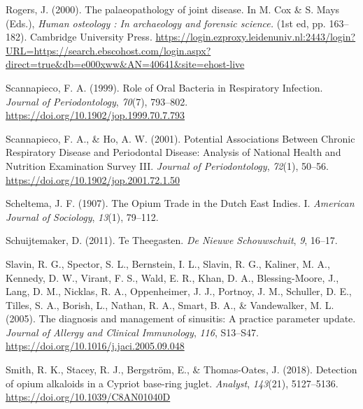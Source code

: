 \documentclass[
]{article}
\newlength{\cslhangindent}
\newlength{\cslentryspacingunit} %
\newenvironment{CSLReferences}[2] %
 {%
  \setlength{\parindent}{0pt}
  \ifodd #1
  \let\oldpar\par
  \def\par{\hangindent=\cslhangindent\oldpar}
  \fi
  \setlength{\parskip}{#2\cslentryspacingunit}
 }%
 {}
\begin{document}
\begin{CSLReferences}{1}{0}
\leavevmode{}%
Rogers, J. (2000). The palaeopathology of joint disease. In M. Cox \& S.
Mays (Eds.), \emph{Human osteology : {In} archaeology and forensic
science.} (1st ed, pp. 163--182). {Cambridge University Press}.
\url{https://login.ezproxy.leidenuniv.nl:2443/login?URL=https://search.ebscohost.com/login.aspx?direct=true\&db=e000xww\&AN=40641\&site=ehost-live}

\leavevmode{}%
Scannapieco, F. A. (1999). Role of {Oral Bacteria} in {Respiratory
Infection}. \emph{Journal of Periodontology}, \emph{70}(7), 793--802.
\url{https://doi.org/10.1902/jop.1999.70.7.793}

\leavevmode{}%
Scannapieco, F. A., \& Ho, A. W. (2001). Potential {Associations Between
Chronic Respiratory Disease} and {Periodontal Disease}: {Analysis} of
{National Health} and {Nutrition Examination Survey III}. \emph{Journal
of Periodontology}, \emph{72}(1), 50--56.
\url{https://doi.org/10.1902/jop.2001.72.1.50}

\leavevmode{}%
Scheltema, J. F. (1907). The {Opium Trade} in the {Dutch East Indies}.
{I}. \emph{American Journal of Sociology}, \emph{13}(1), 79--112.

\leavevmode{}%
Schuijtemaker, D. (2011). Te Theegasten. \emph{De Nieuwe Schouwschuit},
\emph{9}, 16--17.

\leavevmode{}%
Slavin, R. G., Spector, S. L., Bernstein, I. L., Slavin, R. G., Kaliner,
M. A., Kennedy, D. W., Virant, F. S., Wald, E. R., Khan, D. A.,
Blessing-Moore, J., Lang, D. M., Nicklas, R. A., Oppenheimer, J. J.,
Portnoy, J. M., Schuller, D. E., Tilles, S. A., Borish, L., Nathan, R.
A., Smart, B. A., \& Vandewalker, M. L. (2005). The diagnosis and
management of sinusitis: {A} practice parameter update. \emph{Journal of
Allergy and Clinical Immunology}, \emph{116}, S13--S47.
\url{https://doi.org/10.1016/j.jaci.2005.09.048}

\leavevmode{}%
Smith, R. K., Stacey, R. J., Bergström, E., \& Thomas-Oates, J. (2018).
Detection of opium alkaloids in a {Cypriot} base-ring juglet.
\emph{Analyst}, \emph{143}(21), 5127--5136.
\url{https://doi.org/10.1039/C8AN01040D}


\end{CSLReferences}
\end{document}
